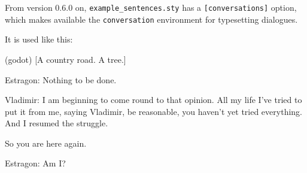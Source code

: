 \documentclass{article}
\begin{document}
%
\noindent From version 0.6.0 on, \verb|example_sentences.sty| has a \verb|[conversations]| 
option, which makes available the \verb|conversation| environment for typesetting dialogues.

It is used like this:
\begin{examples}
    \item(godot) [A country road. A tree.]
    \begin{conversation}
        \item[Estragon:] Nothing to be done.
        \item[Vladimir:] I am beginning to come round to that opinion. All my life I've tried to put it from me, saying Vladimir, be reasonable, you haven't yet tried everything. And I resumed the struggle.

        So you are here again. 
        \item[Estragon:] Am I? 
    \end{conversation}
\end{examples}
\end{document}
